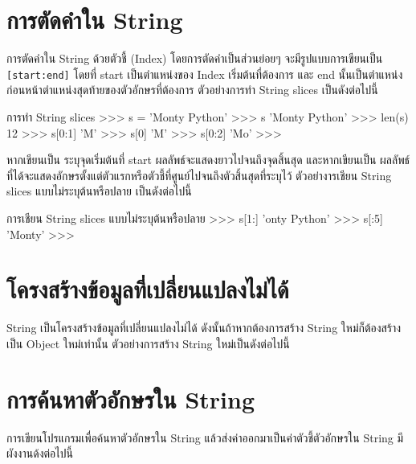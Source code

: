 \section{การตัดคำใน String}

การตัดคำใน String ด้วยตัวชี้ (Index) โดยการตัดคำเป็นส่วนย่อยๆ จะมีรูปแบบการเขียนเป็น \texttt{[start:end]} โดยที่ start เป็นตำแหน่งของ Index เริ่มต้นที่ต้องการ และ end นั้นเป็นตำแหน่งก่อนหน้าตำแหน่งสุดท้ายของตัวอักษรที่ต้องการ ตัวอย่างการทำ String slices เป็นดังต่อไปนี้

\begin{codelist}{การทำ String slices}{}
>>> s = 'Monty Python'
>>> s
'Monty Python'
>>> len(s)
12
>>> s[0:1]
'M'
>>> s[0]
'M'
>>> s[0:2]
'Mo'
>>>
\end{codelist}


หากเขียนเป็น  \pyinline{[start:]} ระบุจุดเริ่มต้นที่ start ผลลัพธ์จะแสดงยาวไปจนถึงจุดสิ้นสุด และหากเขียนเป็น  \pyinline{[:end]} ผลลัพธ์ที่ได้จะแสดงอักษรตั้งแต่ตัวแรกหรือตัวชี้ที่ศูนย์ไปจนถึงตัวสิ้นสุดที่ระบุไว้ ตัวอย่างารเชียน String slices แบบไม่ระบุต้นหรือปลาย เป็นดังต่อไปนี้

\begin{codelist}{การเชียน String slices แบบไม่ระบุต้นหรือปลาย}{}
>>> s[1:]
'onty Python'
>>> s[:5]
'Monty'
>>>
\end{codelist}


\section{โครงสร้างข้อมูลที่เปลี่ยนแปลงไม่ได้}

String เป็นโครงสร้างข้อมูลที่เปลี่ยนแปลงไม่ได้ ดังนั้นถ้าหากต้องการสร้าง String ใหม่ก็ต้องสร้างเป็น Object ใหม่เท่านั้น ตัวอย่างการสร้าง String ใหม่เป็นดังต่อไปนี้



\section{การค้นหาตัวอักษรใน String}

การเขียนโปรแกรมเพื่อค้นหาตัวอักษรใน String แล้วส่งค่าออกมาเป็นค่าตัวชี้ตัวอักษรใน String มีผังงานด้งต่อไปนี้


